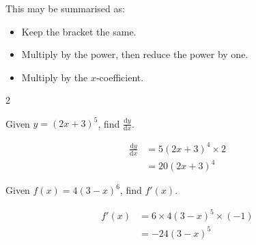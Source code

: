 \documentclass[
  11pt,
  openany]{book}
\begin{document}
\vspace{-0.3cm}

This may be summarised as:

\vspace{-0.1cm}

\begin{itemize}
    \item Keep the bracket the same.
    \item Multiply by the power, then reduce the power by one.
    \item Multiply by the $x$-coefficient.
\end{itemize}

\begin{multicols}{2}

\begin{tcolorbox}[title=Example,colback=RoyalBlue!2!, colframe=RoyalBlue,width=8.5cm,height=4.1cm]

Given $y=(2x+3)^5$, find $\frac{\text{d}y}{\text{d}x}$.

\vspace{-0.1cm}
\tcblower

\vspace{-0.4cm}

\begin{align*}
\frac{\text{d}y}{\text{d}x}&=5(2x+3)^4\times2\\[0.5em]
&=20(2x+3)^4
\end{align*}

\end{tcolorbox}



\begin{tcolorbox}[title=Example,colback=RoyalBlue!2!, colframe=RoyalBlue,width=8.5cm,height=4.1cm]

Given $f(x)=4(3-x)^6$, find $f'(x)$.

\vspace{-0.1cm}
\tcblower

\vspace{-0.3cm}

\begin{align*}
f'(x)&=6\times4(3-x)^5\times(-1)\\[0.5em]
&=-24(3-x)^5
\end{align*}

\end{tcolorbox}

\end{multicols}

\vspace{-1cm}
\end{document}
